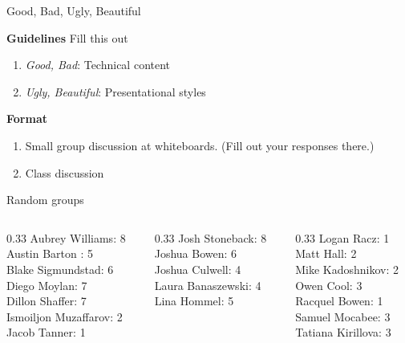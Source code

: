 \documentclass[10pt]{beamer}
\begin{document}
\begin{frame}{Good, Bad, Ugly, Beautiful}

\textbf{Guidelines}
Fill this out
\begin{enumerate}
	\item \textit{Good, Bad}: Technical content
	\item \textit{Ugly, Beautiful}: Presentational styles
\end{enumerate}

\vfill 


\textbf{Format}
\begin{enumerate}
	\item Small group discussion  \alert{at whiteboards}.  (Fill out your responses there.)
	\item Class discussion 
\end{enumerate}
	
\end{frame}

\begin{frame}{Random groups}
\begin{columns}
\begin{column}{0.33\textwidth}
Aubrey Williams: 8 \\ 
Austin Barton : 5 \\ 
Blake Sigmundstad: 6 \\ 
Diego Moylan: 7 \\ 
Dillon Shaffer: 7 \\ 
Ismoiljon Muzaffarov: 2 \\ 
Jacob Tanner: 1 \\\end{column}
\begin{column}{0.33\textwidth}
Josh Stoneback: 8 \\ 
Joshua Bowen: 6 \\ 
Joshua Culwell: 4 \\ 
Laura Banaszewski: 4 \\ 
Lina Hommel: 5 \\\end{column}
\begin{column}{0.33\textwidth}
Logan Racz: 1 \\ 
Matt Hall: 2 \\ 
Mike Kadoshnikov: 2 \\ 
Owen Cool: 3 \\ 
Racquel Bowen: 1 \\ 
Samuel Mocabee: 3 \\ 
Tatiana Kirillova: 3 \\\end{column}
\end{columns}	
\end{frame}
\end{document}
